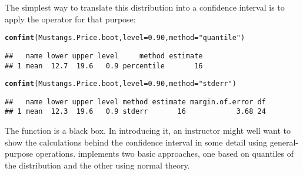 \documentclass[11pt]{article}\usepackage[]{graphicx}\usepackage[]{color}
\makeatletter
\newcommand{\hlnum}[1]{\textcolor[rgb]{0.686,0.059,0.569}{#1}}%
\newcommand{\hlstr}[1]{\textcolor[rgb]{0.192,0.494,0.8}{#1}}%
\newcommand{\hlstd}[1]{\textcolor[rgb]{0.345,0.345,0.345}{#1}}%
\newcommand{\hlkwc}[1]{\textcolor[rgb]{0.333,0.667,0.333}{#1}}%
\newcommand{\hlkwd}[1]{\textcolor[rgb]{0.737,0.353,0.396}{\textbf{#1}}}%
\newenvironment{kframe}{%
 \def\at@end@of@kframe{}%
 \ifinner\ifhmode%
  \def\at@end@of@kframe{\end{minipage}}%
  \begin{minipage}{\columnwidth}%
 \fi\fi%
 \def\FrameCommand##1{\hskip\@totalleftmargin \hskip-\fboxsep
 \colorbox{shadecolor}{##1}\hskip-\fboxsep
     \hskip-\linewidth \hskip-\@totalleftmargin \hskip\columnwidth}%
 \MakeFramed {\advance\hsize-\width
   \@totalleftmargin\z@ \linewidth\hsize
   \@setminipage}}%
 {\par\unskip\endMakeFramed%
 \at@end@of@kframe}
\newenvironment{knitrout}{}{} %
\makeatother
\begin{document}
The simplest way to translate this distribution into a confidence interval is to apply the operator for that purpose:
\begin{knitrout}
\color{fgcolor}\begin{kframe}
\begin{alltt}
\hlkwd{confint}\hlstd{(Mustangs.Price.boot,} \hlkwc{level} \hlstd{=} \hlnum{0.90}\hlstd{,} \hlkwc{method} \hlstd{=} \hlstr{"quantile"}\hlstd{)}
\end{alltt}
\begin{verbatim}
##   name lower upper level     method estimate
## 1 mean  12.7  19.6   0.9 percentile       16
\end{verbatim}
\begin{alltt}
\hlkwd{confint}\hlstd{(Mustangs.Price.boot,} \hlkwc{level} \hlstd{=} \hlnum{0.90}\hlstd{,} \hlkwc{method} \hlstd{=} \hlstr{"stderr"}\hlstd{)}
\end{alltt}
\begin{verbatim}
##   name lower upper level method estimate margin.of.error df
## 1 mean  12.3  19.6   0.9 stderr       16            3.68 24
\end{verbatim}
\end{kframe}
\end{knitrout}
The  function is a black box.  In introducing it, an instructor might well want to show the calculations behind the confidence interval in some detail using general-purpose operations.   implements two basic approaches, one based on quantiles of the distribution and the other using normal theory.
\end{document}
